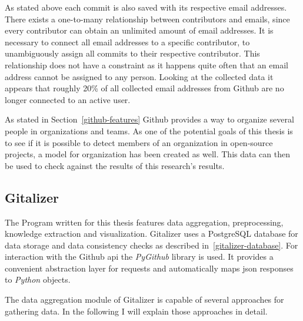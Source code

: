 As stated above each commit is also saved with its respective email addresses.
There exists a one-to-many relationship between contributors and emails, since every contributor can obtain an unlimited amount of email addresses.
It is necessary to connect all email addresses to a specific contributor, to unambiguously assign all commits to their respective contributor.
This relationship does not have a  constraint as it happens quite often that an email address cannot be assigned to any person.
Looking at the collected data it appears that roughly 20\% of all collected email addresses from Github are no longer connected to an active user.

As stated in Section~\ref{github-features} Github provides a way to organize several people in organizations and teams.
As one of the potential goals of this thesis is to see if it is possible to detect members of an organization in open-source projects, a model for organization has been created as well.
This data can then be used to check against the results of this research's results.


\subsection{Gitalizer}
The Program written for this thesis features data aggregation, preprocessing, knowledge extraction and visualization.
Gitalizer uses a PostgreSQL database for data storage and data consistency checks as described in~\ref{gitalizer-database}.
For interaction with the Github \ac{api} the \emph{PyGithub} library is used.
It provides a convenient abstraction layer for requests and automatically maps \ac{json} responses to \emph{Python} objects.

The data aggregation module of Gitalizer is capable of several approaches for gathering data.
In the following I will explain those approaches in detail.

